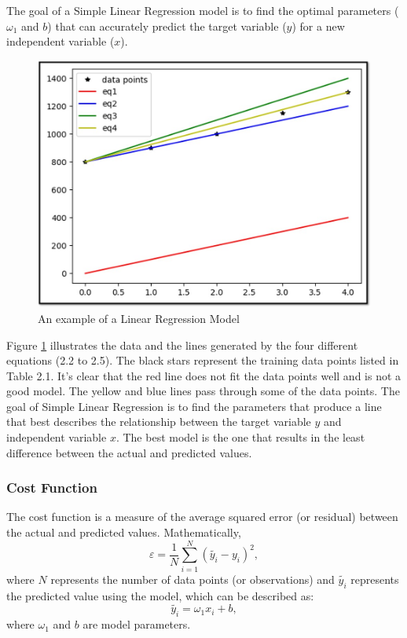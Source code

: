 The goal of a Simple Linear Regression model is to find the optimal parameters ($\omega_1$ and $b$) that can accurately predict the target variable ($y$)  for a new independent variable ($x$).

\begin{figure}[!h]
  \centering
  \includegraphics[width=8.2 cm]{LRmodel.jpg}
  \caption{An example of a Linear Regression Model}
  \label{fig:LRmodel}
\end{figure}

Figure \ref{fig:LRmodel} illustrates the data and the lines generated by the four different equations (2.2 to 2.5). The black stars represent the training data points listed in Table 2.1. It's clear that the red line does not fit the data points well and is not a good model. The yellow and blue lines pass through some of the data points. The goal of Simple Linear Regression is to find the parameters that produce a line that best describes the relationship between the target variable $y$ and independent variable $x$. The best model is the one that results in the least difference between the actual and predicted values.

\subsubsection{\textbf{Cost Function}}

The cost function is a measure of the average squared error (or residual) between the actual and predicted values. Mathematically,
\begin{equation}\label{eq:cost}
  \varepsilon = \frac{1}{N}\sum_{i=1}^N (\tilde{y_i}-y_i)^2,
\end{equation} where $N$ represents the number of data points (or observations) and $\tilde{y_i}$ represents the predicted value using the model, which can be described as:
\begin{equation}\label{eq:ypred}
   \tilde{y_i} = \omega_1 x_i + b,
\end{equation}where $\omega_1$ and $b$ are model parameters.


